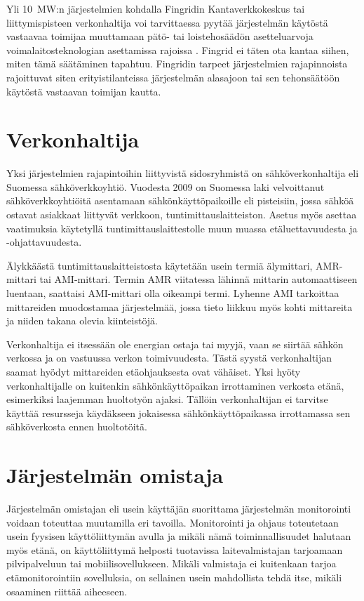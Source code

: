   Yli \SI{10}{\mega\watt}:n järjestelmien kohdalla Fingridin Kantaverkkokeskus tai liittymispisteen verkonhaltija voi tarvittaessa pyytää järjestelmän käytöstä vastaavaa toimijaa muuttamaan pätö- tai loistehosäädön asetteluarvoja voimalaitosteknologian asettamissa rajoissa \parencite{VJV2018}. Fingrid ei täten ota kantaa siihen, miten tämä säätäminen tapahtuu. Fingridin tarpeet järjestelmien rajapinnoista rajoittuvat siten erityistilanteissa järjestelmän alasajoon tai sen tehonsäätöön käytöstä vastaavan toimijan kautta.

\section{Verkonhaltija}

  Yksi järjestelmien rajapintoihin liittyvistä sidosryhmistä on sähköverkonhaltija eli Suomessa sähköverkkoyhtiö. Vuodesta 2009 on Suomessa laki velvoittanut sähköverkkoyhtiöitä asentamaan sähkönkäyttöpaikoille eli pisteisiin, jossa sähköä ostavat asiakkaat liittyvät verkkoon, tuntimittauslaitteiston. Asetus myös asettaa vaatimuksia käytetyllä tuntimittauslaittestolle muun muassa etäluettavuudesta ja -ohjattavuudesta. \parencite{mittariAsetus}

  Älykkäästä tuntimittauslaitteistosta käytetään usein termiä älymittari, \gls{AMR}-mittari tai \gls{AMI}-mittari. Termin \gls{AMR} viitatessa lähinnä mittarin automaattiseen luentaan, saattaisi \gls{AMI}-mittari olla oikeampi termi. Lyhenne \gls{AMI} tarkoittaa mittareiden muodostamaa järjestelmää, jossa tieto liikkuu myös kohti mittareita ja niiden takana olevia kiinteistöjä. \parencite{dictOfEnergy}

  Verkonhaltija ei itsessään ole energian ostaja tai myyjä, vaan se siirtää sähkön verkossa ja on vastuussa verkon toimivuudesta. Tästä syystä verkonhaltijan saamat hyödyt mittareiden etäohjauksesta ovat vähäiset. Yksi hyöty verkonhaltijalle on kuitenkin sähkönkäyttöpaikan irrottaminen verkosta etänä, esimerkiksi laajemman huoltotyön ajaksi. Tällöin verkonhaltijan ei tarvitse käyttää resursseja käydäkseen jokaisessa sähkönkäyttöpaikassa irrottamassa sen sähköverkosta ennen huoltotöitä.

\section{Järjestelmän omistaja}

  Järjestelmän omistajan eli usein käyttäjän suorittama järjestelmän monitorointi voidaan toteuttaa muutamilla eri tavoilla. Monitorointi ja ohjaus toteutetaan usein fyysisen käyttöliittymän avulla ja mikäli nämä toiminnallisuudet halutaan myös etänä, on käyttöliittymä helposti tuotavissa laitevalmistajan tarjoamaan pilvipalveluun tai mobiilisovellukseen. Mikäli valmistaja ei kuitenkaan tarjoa etämonitorointiin sovelluksia, on sellainen usein mahdollista tehdä itse, mikäli osaaminen riittää aiheeseen.

